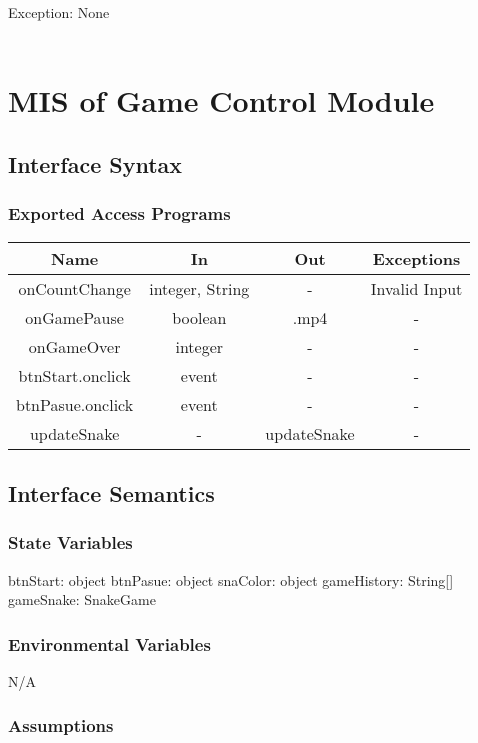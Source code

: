 \documentclass[12pt, titlepage]{article}
\begin{document}
		Exception: None\\
		\\

\section{MIS of Game Control Module}
	\subsection{Interface Syntax}
		\subsubsection{Exported Access Programs}
		\begin{table}[!htbp]
				\begin{tabular}{|c|c|c|c|}
						\hline
	\textbf{Name}& \textbf{In} & \textbf{Out} & \textbf{Exceptions} \\ 
	\hline
					onCountChange & integer, String & - & Invalid Input \\ \hline
					onGamePause & boolean & .mp4 & - \\ \hline
					onGameOver & integer & - & - \\ \hline
					btnStart.onclick & event & - & - \\ \hline
					btnPasue.onclick & event & - & - \\ \hline
					updateSnake & - & updateSnake & -\\ \hline
				\end{tabular}
			\end{table}
	\subsection{Interface Semantics}
		\subsubsection{State Variables}
		btnStart: object
		btnPasue: object
		snaColor: object
		gameHistory: String[]
		gameSnake: SnakeGame
		\subsubsection{Environmental Variables}
		
		N/A
		
		\subsubsection{Assumptions}
		
\end{document}
